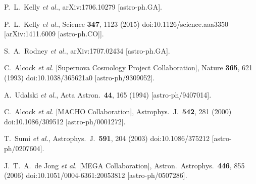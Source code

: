 \documentclass[showpacs,twocolumn,preprintnumbers,amsmath,amssymb,superscriptaddress,nofootinbib]{revtex4}
\begin{document}
\begin{thebibliography}{0}

  P.~L.~Kelly {\it et al.},
  arXiv:1706.10279 [astro-ph.GA].

  P.~L.~Kelly {\it et al.},
  Science {\bf 347}, 1123 (2015)
  doi:10.1126/science.aaa3350
  [arXiv:1411.6009 [astro-ph.CO]].

  S.~A.~Rodney {\it et al.},
  arXiv:1707.02434 [astro-ph.GA].

  C.~Alcock {\it et al.} [Supernova Cosmology Project Collaboration],
  Nature {\bf 365}, 621 (1993)
  doi:10.1038/365621a0
  [astro-ph/9309052].

  A.~Udalski {\it et al.},
  Acta Astron.\  {\bf 44}, 165 (1994)
  [astro-ph/9407014].

  C.~Alcock {\it et al.} [MACHO Collaboration],
  Astrophys.\ J.\  {\bf 542}, 281 (2000)
  doi:10.1086/309512
  [astro-ph/0001272].

  T.~Sumi {\it et al.},
  Astrophys.\ J.\  {\bf 591}, 204 (2003)
  doi:10.1086/375212
  [astro-ph/0207604].

  J.~T.~A.~de Jong {\it et al.} [MEGA Collaboration],
  Astron.\ Astrophys.\  {\bf 446}, 855 (2006)
  doi:10.1051/0004-6361:20053812
  [astro-ph/0507286].


\end{thebibliography}
\end{document}
